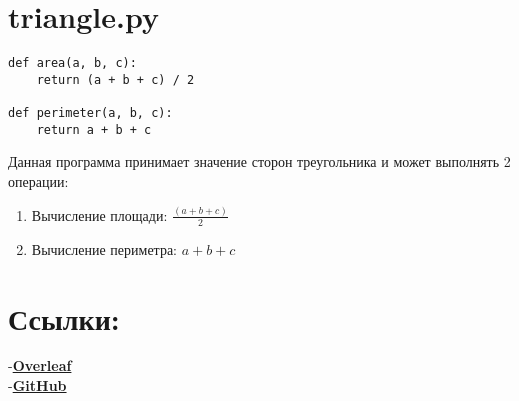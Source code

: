 \documentclass[a4paper,30pt]{article}
\begin{document}
\section*{triangle.py}
\begin{lstlisting}
def area(a, b, c):
    return (a + b + c) / 2

def perimeter(a, b, c):
    return a + b + c
\end{lstlisting}
\begin{center}
\large
Данная программа принимает значение сторон треугольника и может выполнять 2 операции:
\begin{enumerate}
    \item Вычисление площади: $\frac{(a+b+c)}{2}$
    \item Вычисление периметра: $a+b+c$
\end{enumerate}
\end{center}

\section*{Ссылки:}
-\href{https://ru.overleaf.com/read/pcqnnhntbbtn#2bfdaf}{\textbf{Overleaf}}
\\
-\href{https://github.com/dshumilin03/geometric_lib/blob/documentation-latex/docs/readme.tex}{\textbf{GitHub}}
\end{document}
